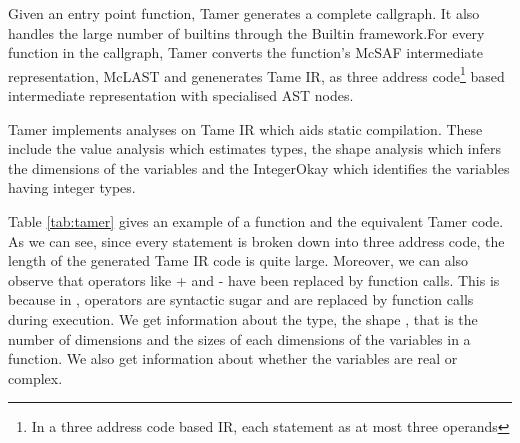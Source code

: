 Given an entry point function, Tamer generates a complete callgraph. It also handles the large number of \matlab builtins through the Builtin framework.For every function in the callgraph, Tamer converts the function's McSAF intermediate representation, McLAST and genenerates Tame IR, as three address code\footnote{In a three address code based IR, each statement as at most three operands} based intermediate representation with specialised AST nodes. 

Tamer implements analyses on Tame IR which aids static compilation. These include the value analysis which estimates \matlab types, the shape analysis\cite{Li:2014} which infers the dimensions of the variables and the IntegerOkay\cite{vkumar14} which identifies the variables having integer types. 

Table \ref{tab:tamer} gives an example of a \matlab function and the equivalent Tamer code. As we can see, since every statement is broken down into three address code, the length of the generated Tame IR code is quite large. Moreover, we can also observe that operators like \textsf{+} and \textsf{-} have been replaced by function calls. This is because in \matlab, operators are syntactic sugar and are replaced by function calls during execution. We get information about the type, the shape , that is the number of dimensions and the sizes of each dimensions of the variables in a function. We also get information about whether the variables are real or complex. 

